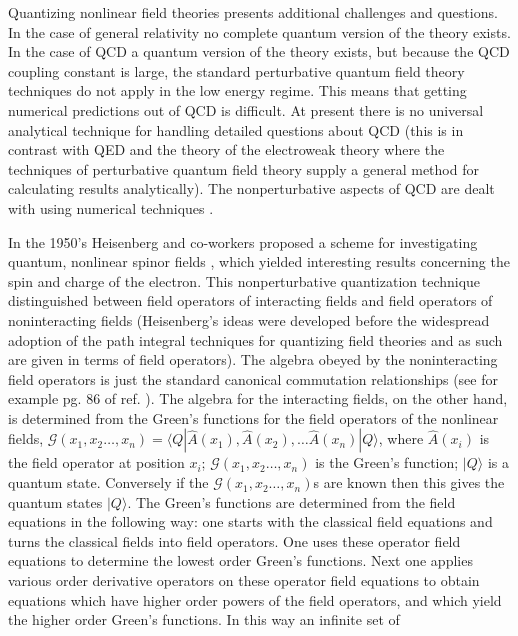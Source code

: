 \documentclass[a4paper,aps,showpacs]{revtex4}
\begin{document}
Quantizing nonlinear field theories presents additional
challenges and questions. In the case of general relativity
no complete quantum version of the theory exists. In the case
of QCD a quantum version of the theory exists, but
because the QCD coupling constant is large, the standard perturbative
quantum field theory techniques do not apply in the low energy
regime. This means that
getting numerical predictions out of QCD is difficult. At present
there is no universal analytical technique for handling detailed
questions about QCD (this is in contrast with QED and the theory
of the electroweak theory where the techniques of perturbative
quantum field theory supply a general method for calculating
results analytically). The nonperturbative aspects of QCD are dealt
with using numerical techniques \cite{chernodub}.

In the 1950's Heisenberg and co-workers proposed a scheme for
investigating quantum, nonlinear spinor fields \cite{heisenberg}, which
yielded interesting results concerning the spin
and charge of the electron. This nonperturbative quantization technique
distinguished between field operators of interacting fields and
field operators of noninteracting fields (Heisenberg's ideas
were developed before the widespread adoption of the path
integral techniques for quantizing field theories and as such
are given in terms of field operators). The algebra obeyed by the
noninteracting field operators is just the standard canonical
commutation relationships (see for example pg. 86 of ref.
\cite{mandl}). The algebra for the interacting fields, on the
other hand, is determined from the Green's functions for the
field operators of the nonlinear fields,
$\mathcal{G}(x_1, x_2 \ldots , x_n) = \langle Q |
\hat{A}(x_1), \hat{A}(x_2), \ldots \hat{A}(x_n) | Q \rangle$,
where $\hat{A}(x_i)$ is the field operator at position $x_i$;
$\mathcal{G}(x_1, x_2 \ldots , x_n)$ is the Green's function;
$|Q\rangle$ is a quantum state. Conversely if the
$\mathcal{G}(x_1, x_2 \ldots , x_n)$s are known then this
gives the quantum states $|Q\rangle$. The Green's functions
are determined from the field equations in the following way:
one starts with the classical field equations and turns the
classical fields into field operators. One uses these
operator field equations to determine the
lowest order Green's functions. Next one applies various order
derivative operators on these operator
field equations to obtain equations which have higher
order powers of the field operators, and which yield the
higher order Green's functions. In this way an infinite set of
\end{document}
